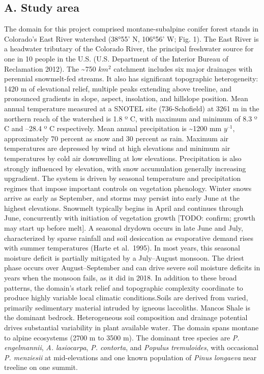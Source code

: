 \documentclass[
  12pt,
]{article}
\begin{document}
\hypertarget{a.-study-area}{%
\subsection{A. Study area}\label{a.-study-area}}

The domain for this project comprised montane-subalpine conifer forest
stands in Colorado's East River watershed (38°55' N, 106°56' W; Fig. 1).
The East River is a headwater tributary of the Colorado River, the
principal freshwater source for one in 10 people in the U.S. (U.S.
Department of the Interior Bureau of Reclamation 2012). The
\textasciitilde750 \(km^2\) catchment includes six major drainages with
perennial snowmelt-fed streams. It also has significant topographic
heterogeneity: 1420 m of elevational relief, multiple peaks extending
above treeline, and pronounced gradients in slope, aspect, insolation,
and hillslope position. Mean annual temperature measured at a SNOTEL
site (736-Schofield) at 3261 m in the northern reach of the watershed is
1.8 º C, with maximum and minimum of 8.3 º C and --28.4 º C
respectively. Mean annual precipitation is \textasciitilde1200 mm
\(y^{–1}\), approximately 70 percent as snow and 30 percent as rain.
Maximum air temperatures are depressed by wind at high elevations and
minimum air temperatures by cold air downwelling at low elevations.
Precipitation is also strongly influenced by elevation, with snow
accumulation generally increasing upgradient. The system is driven by
seasonal temperature and precipitation regimes that impose important
controls on vegetation phenology. Winter snows arrive as early as
September, and storms may persist into early June at the highest
elevations. Snowmelt typically begins in April and continues through
June, concurrently with initiation of vegetation growth {[}TODO:
confirm; growth may start up before melt{]}. A seasonal drydown occurs
in late June and July, characterized by sparse rainfall and soil
desiccation as evaporative demand rises with summer temperatures (Harte
et al.~1995). In most years, this seasonal moisture deficit is partially
mitigated by a July--August monsoon. The driest phase occurs over
August--September and can drive severe soil moisture deficits in years
when the monsoon fails, as it did in 2018. In addition to these broad
patterns, the domain's stark relief and topographic complexity
coordinate to produce highly variable local climatic conditions.Soils
are derived from varied, primarily sedimentary material intruded by
igneous laccoliths. Mancos Shale is the dominant bedrock. Heterogeneous
soil composition and drainage potential drives substantial variability
in plant available water. The domain spans montane to alpine ecosystems
(2700 m to 3500 m). The dominant tree species are \emph{P. engelmannii},
\emph{A. lasiocarpa}, \emph{P. contorta}, and \emph{Populus
tremuloides}, with occasional \emph{P. menziesii} at mid-elevations and
one known population of \emph{Pinus longaeva} near treeline on one
summit.
\end{document}
